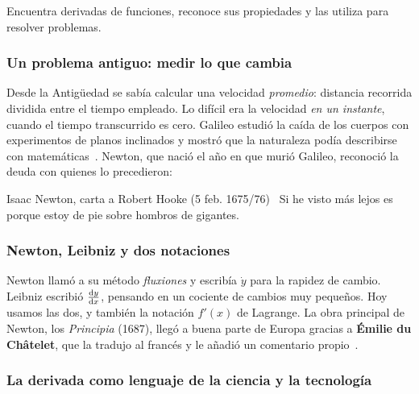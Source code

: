 \documentclass[11pt]{article}
\begin{document}
\begin{dba}
Encuentra derivadas de funciones, reconoce sus propiedades y las utiliza
para resolver problemas.
\end{dba}


\subsubsection*{Un problema antiguo: medir lo que cambia}

Desde la Antigüedad se sabía calcular una velocidad \emph{promedio}:
distancia recorrida dividida entre el tiempo empleado. Lo difícil era la
velocidad \emph{en un instante}, cuando el tiempo transcurrido es cero.
Galileo estudió la caída de los cuerpos con experimentos de planos
inclinados y mostró que la naturaleza podía describirse con
matemáticas~\cite{galileo1623}. Newton, que nació el año en que murió
Galileo, reconoció la deuda con quienes lo precedieron:

\begin{cita}{Isaac Newton, carta a Robert Hooke (5 feb. 1675/76)~\cite{newton1676}}
Si he visto más lejos es porque estoy de pie sobre hombros de gigantes.
\end{cita}

\subsubsection*{Newton, Leibniz y dos notaciones}

Newton llamó a su método \emph{fluxiones} y escribía $\dot{y}$ para la
rapidez de cambio. Leibniz escribió $\frac{\mathrm{d}y}{\mathrm{d}x}$, pensando en un cociente
de cambios muy pequeños. Hoy usamos las dos, y también la notación $f'(x)$
de Lagrange. La obra principal de Newton, los \emph{Principia} (1687),
llegó a buena parte de Europa gracias a \textbf{Émilie du Châtelet}, que la
tradujo al francés y le añadió un comentario propio~\cite{chatelet1759}.

\subsubsection*{La derivada como lenguaje de la ciencia y la tecnología}
\end{document}
